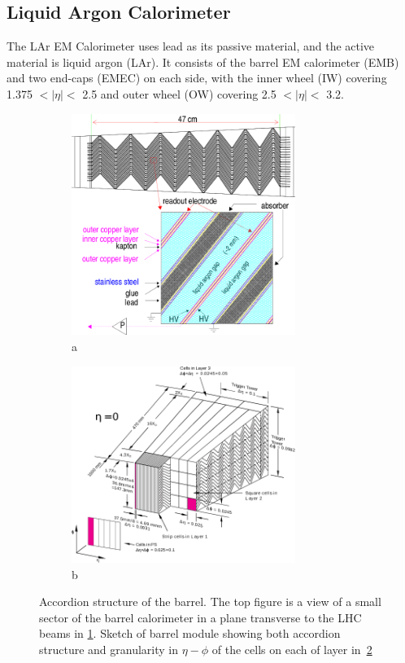 \subsection{Liquid Argon Calorimeter}
\par The LAr EM Calorimeter uses lead as its passive material, and the active material is liquid argon (LAr). 
It consists of the barrel EM calorimeter (EMB) and two end-caps (EMEC) on each side, with the inner wheel (IW) covering 1.375 $< |\eta| <$ 2.5 and outer wheel 
(OW) covering 2.5 $< |\eta| <$ 3.2.
\begin{figure}[htbp!]
\begin{subfigure}{.5\textwidth}
 \centering
 \includegraphics[width=0.8\textwidth]{chapters/c4/figures/lar-layers}
 \caption{a}
 \label{fig:lar1}
\end{subfigure}%
\begin{subfigure}{.5\textwidth}
 \centering
 \includegraphics[width=0.8\textwidth]{chapters/c4/figures/lar}
 \caption{b}
 \label{fig:lar2}
\end{subfigure}
 \caption{
Accordion structure of the barrel. The top figure is a view of a small
 sector of the barrel calorimeter in a plane transverse to the LHC beams in \ref{fig:lar1}.
 Sketch of barrel module showing both accordion structure and granularity in $\eta - \phi$ of the cells on each of layer in~\ref{fig:lar2}}
\label{fig:pixel}
\end{figure}


